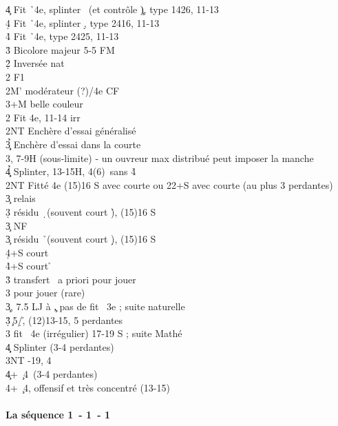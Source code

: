 \documentclass[a4paper]{article}
\begin{document}
\begin{bidtable}
4\c \> Fit \h\ 4e, splinter \s\ (et contrôle \c ), type 1426, 11-13\\
4\d \> Fit \h\ 4e, splinter \d , type 2416, 11-13\\
4\h \> Fit \h\ 4e, type 2425, 11-13\-\\
3\h \> Bicolore majeur 5-5 FM\-\\
2\d\h \> Inversée nat\+\\
2\s \> F1\\
2M' \> modérateur (?)/4e CF\\
3\s {}+M belle couleur\-\\
2\s \> Fit 4e, 11-14 irr\+\\
2NT \> Enchère d'essai généralisé\\
3\c\d\h \> Enchère d'essai dans la courte\\
3\s {}\s , 7-9H (sous-limite) - un ouvreur max distribué peut imposer la manche\\
4\c\d\h \> Splinter, 13-15H, 4(6)\s\ sans 4\h \-\\
2NT \> Fitté 4e (15)16 S avec courte ou 22+S avec courte (au plus 3 perdantes)\+\\
3\c \> relais\+\\
3\d \> résidu \d\ (souvent court \h ), (15)16 S\+\\
3\c \> NF\-\\
3\c \> résidu \h\ (souvent court \d ), (15)16 S\\
4\d {}+S court \d \\
4\h {}+S court \h \-\\
3\h \> transfert \s\ a priori pour jouer\\
3\s \> pour jouer (rare)\-\\
3\c {}, 7.5 LJ à \c , pas de fit \s\ 3e ; suite naturelle\\
3\d\h {}\c\ 5\d /\h , (12)13-15, 5 perdantes\\
3\s \> fit \s\ 4e (irrégulier) 17-19 S ; suite Mathé\\
4\c\d \> Splinter (3-4 perdantes)\\
3NT -19, 4\s \\
4\c {}+ \c\ 4\s\ (3-4 perdantes)\\
4\s {}+ \c\ 4\s , offensif et très concentré (13-15)
\end{bidtable}

\paragraph{La séquence 1\pdfc\ - 1\pdfh\ - 1\pdfs}
\end{document}
